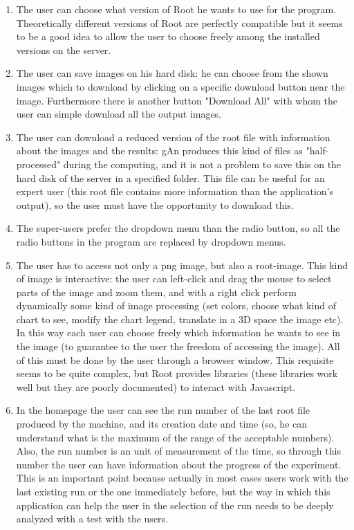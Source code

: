 \begin{enumerate}
\item The user can choose what version of Root he wants to use for the program. Theoretically different versions of Root are perfectly compatible but it seems to be a good idea to allow the user to choose freely among the installed versions on the server.  

\item The user can save images on his hard disk: he can choose from the shown images which to download by clicking on a specific download button near the image. Furthermore there is another button "Download All" with whom the user can simple download all the output images.

\item The user can download a reduced version of the root file with information about the images and the results: gAn produces this kind of files as "half-processed" during the computing, and it is not a problem to save this on the hard disk of the server in a specified folder. This file can be useful for an expert user (this root file contains more information than the application's output), so the user must have the opportunity to download this.     

\item The super-users prefer the dropdown menu than the radio button, so all the radio buttons in the program are replaced by dropdown menus.

\item The user has to access not only a png image, but also a root-image. This kind of image is interactive: the user can left-click and drag the mouse to select parts of the image and zoom them, and with a right click perform dynamically some kind of image processing (set colors, choose what kind of chart to see, modify the chart legend, translate in a 3D space the image etc). In this way each user can choose freely which information he wants to see in the image (to guarantee to the user the freedom of accessing the image).
All of this must be done by the user through a browser window. This requisite seems to be quite complex, but Root provides libraries (these libraries work well but they are poorly documented) to interact with Javascript.

\item In the homepage the user can see the run number of the last root file produced by the machine, and its creation date and time (so, he can understand what is the maximum of the range of the acceptable numbers). Also, the run number is an unit of measurement of the time, so through this number the user can have information about the progress of the experiment. This is an important point because actually in most cases users work with the last existing run or the one immediately before, but the way in which this application can help the user in the selection of the run needs to be deeply analyzed with a test with the users. 


\end{enumerate}
